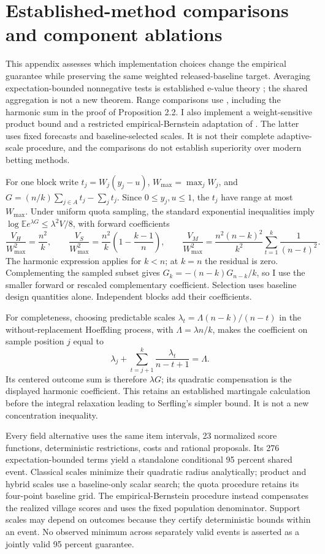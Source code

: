 \documentclass[11pt]{article}
\newcommand{\E}{\mathbb{E}}
\begin{document}
\clearpage

\clearpage
\clearpage
\section{Established-method comparisons and component ablations}\label{app:methodcomparison}

This appendix assesses which implementation choices change the empirical guarantee while preserving the same weighted released-baseline target. Averaging expectation-bounded nonnegative tests is established e-value theory \citep{vovk2021}; the shared aggregation is not a new theorem. Range comparisons use \citet{bardenet2015}, including the harmonic sum in the proof of Proposition 2.2. I also implement a weight-sensitive product bound and a restricted empirical-Bernstein adaptation of \citet{waudby2020}. The latter uses fixed forecasts and baseline-selected scales. It is not their complete adaptive-scale procedure, and the comparisons do not establish superiority over modern betting methods.

For one block write $t_j=W_j(y_j-u)$, $W_{\max}=\max_jW_j$, and $G=(n/k)\sum_{j\in A}t_j-\sum_jt_j$. Since $0\leq y_j,u\leq1$, the $t_j$ have range at most $W_{\max}$. Under uniform quota sampling, the standard exponential inequalities imply $\log\E e^{\lambda G}\leq\lambda^2 V/8$, with forward coefficients
\[
\frac{V_H}{W_{\max}^2}=\frac{n^2}{k},\qquad
\frac{V_S}{W_{\max}^2}=\frac{n^2}{k}\left(1-\frac{k-1}{n}\right),\qquad
\frac{V_M}{W_{\max}^2}=\frac{n^2(n-k)^2}{k^2}\sum_{t=1}^k\frac{1}{(n-t)^2}.
\]
The harmonic expression applies for $k<n$; at $k=n$ the residual is zero. Complementing the sampled subset gives $G_k=-(n-k)G_{n-k}/k$, so I use the smaller forward or rescaled complementary coefficient. Selection uses baseline design quantities alone. Independent blocks add their coefficients.

For completeness, choosing predictable scales $\lambda_t=\Lambda(n-k)/(n-t)$ in the without-replacement Hoeffding process, with $\Lambda=\lambda n/k$, makes the coefficient on sample position $j$ equal to
\[
\lambda_j+\sum_{t=j+1}^k\frac{\lambda_t}{n-t+1}=\Lambda.
\]
Its centered outcome sum is therefore $\lambda G$; its quadratic compensation is the displayed harmonic coefficient. This retains an established martingale calculation before the integral relaxation leading to Serfling's simpler bound. It is not a new concentration inequality.

Every field alternative uses the same item intervals, 23 normalized score functions, deterministic restrictions, costs and rational proposals. Its 276 expectation-bounded terms yield a standalone conditional 95 percent shared event. Classical scales minimize their quadratic radius analytically; product and hybrid scales use a baseline-only scalar search; the quota procedure retains its four-point baseline grid. The empirical-Bernstein procedure instead compensates the realized village scores and uses the fixed population denominator. Support scales may depend on outcomes because they certify deterministic bounds within an event. No observed minimum across separately valid events is asserted as a jointly valid 95 percent guarantee.
\end{document}
